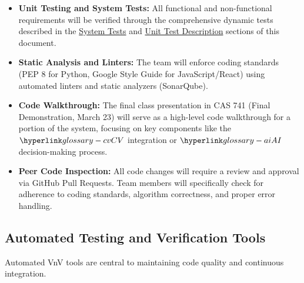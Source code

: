 \documentclass[12pt, titlepage]{article}
\begin{document}
\begin{itemize}
    \item \textbf{Unit Testing and System Tests:} All functional and non-functional requirements will be verified through the comprehensive dynamic tests described in the \hyperref[sec:srs-system]{System Tests} and \hyperref[sec:unit-test-description]{Unit Test Description} sections of this document.
    \item \textbf{Static Analysis and Linters:} The team will enforce coding standards (PEP 8 for Python, Google Style Guide for JavaScript/React) using automated linters and static analyzers (SonarQube).
    \item \textbf{Code Walkthrough:} The final class presentation in CAS 741 (Final Demonstration, March 23) will serve as a high-level code walkthrough for a portion of the system, focusing on key components like the $\CV{}$ integration or $\AI{}$ decision-making process.
    \item \textbf{Peer Code Inspection:} All code changes will require a review and approval via GitHub Pull Requests.
    Team members will specifically check for adherence to coding standards, algorithm correctness, and proper error handling.
\end{itemize}

\subsection{Automated Testing and Verification Tools}





Automated VnV tools are central to maintaining code quality and continuous integration.
\end{document}
